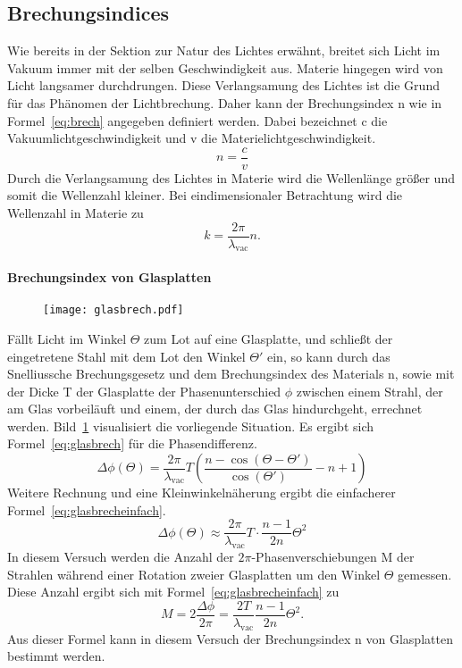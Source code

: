\subsection{Brechungsindices}
Wie bereits in der Sektion zur Natur des Lichtes erwähnt, 
breitet sich Licht im Vakuum immer mit der selben Geschwindigkeit 
aus. Materie hingegen wird von Licht langsamer durchdrungen. 
Diese Verlangsamung des Lichtes ist die Grund für das Phänomen der 
Lichtbrechung. Daher kann der Brechungsindex n wie in 
Formel~\eqref{eq:brech} 
angegeben definiert werden. Dabei bezeichnet c die 
Vakuumlichtgeschwindigkeit und v die Materielichtgeschwindigkeit.
\begin{equation}
n = \frac{c}{v}
\label{eq:brech}
\end{equation}
Durch die Verlangsamung des Lichtes in Materie wird die Wellenlänge 
größer und somit die Wellenzahl kleiner. Bei eindimensionaler 
Betrachtung wird die Wellenzahl in Materie zu
\begin{equation*}
k = \frac{2\pi}{\lambda_\text{vac}}n.
\end{equation*}
\paragraph{Brechungsindex von Glasplatten}
%
\begin{figure}
\centering
\texttt{[image: glasbrech.pdf]}
\label{fig:brechglas}
\end{figure}
%
Fällt Licht im Winkel $\Theta$ zum Lot auf eine Glasplatte, 
und schließt der eingetretene Stahl mit dem Lot den Winkel $\Theta'$ ein, 
so kann durch das 
Snelliussche Brechungsgesetz und dem Brechungsindex des Materials n, 
sowie mit der Dicke T der Glasplatte der Phasenunterschied $\phi$ zwischen 
einem Strahl, der am Glas vorbeiläuft und einem, der durch das Glas 
hindurchgeht, errechnet werden. 
Bild~\ref{fig:brechglas} visualisiert die vorliegende Situation.
Es ergibt sich 
Formel~\eqref{eq:glasbrech} für die Phasendifferenz.
\begin{equation}
\Delta\phi(\Theta) = \frac{2\pi}{\lambda_\text{vac}}T\left(
\frac{n-\cos(\Theta - \Theta')}{\cos(\Theta')} - n+1\right)
\label{eq:glasbrech}
\end{equation}
Weitere Rechnung und eine Kleinwinkelnäherung ergibt die einfacherer 
Formel~\eqref{eq:glasbrecheinfach}.
\begin{equation}
\Delta\phi(\Theta) \approx \frac{2\pi}{\lambda_\text{vac}}T\cdot
\frac{n-1}{2n}\Theta^2
\label{eq:glasbrecheinfach}
\end{equation}
In diesem Versuch werden die Anzahl der $2\pi$-Phasenverschiebungen M
der Strahlen während einer Rotation zweier Glasplatten um den Winkel 
$\Theta$ gemessen. Diese Anzahl ergibt sich mit 
Formel~\eqref{eq:glasbrecheinfach} zu
\begin{equation}
M = 2\frac{\Delta\phi}{2\pi} = \frac{2T}{\lambda_\text{vac}}
\frac{n-1}{2n}\Theta^2.
\label{eq:glasfringes}
\end{equation}
Aus dieser Formel kann in diesem Versuch der Brechungsindex n von 
Glasplatten bestimmt werden.\\
